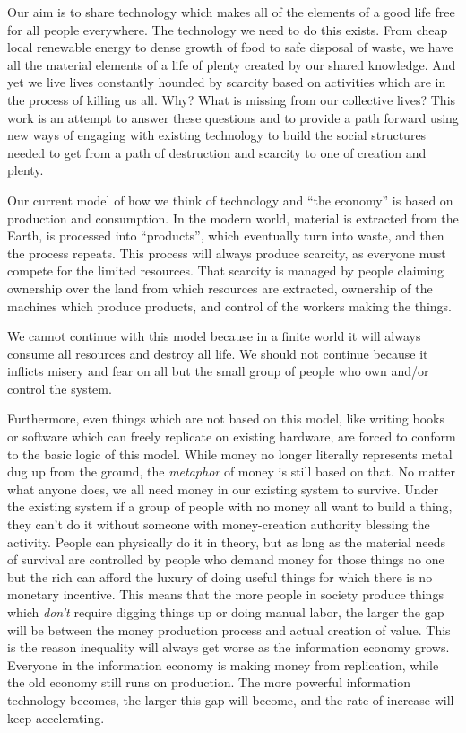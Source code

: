 

Our aim is to share technology which makes all of the elements of a good
life free for all people everywhere. The technology we need to do this
exists. From cheap local renewable energy to dense growth of food to
safe disposal of waste, we have all the material elements of a life of
plenty created by our shared knowledge. And yet we live lives constantly
hounded by scarcity based on activities which are in the process of
killing us all. Why? What is missing from our collective lives? This
work is an attempt to answer these questions and to provide a path
forward using new ways of engaging with existing technology to build the
social structures needed to get from a path of destruction and scarcity
to one of creation and plenty.

Our current model of how we think of technology and ``the economy'' is
based on production and consumption. In the modern world, material is
extracted from the Earth, is processed into ``products'', which
eventually turn into waste, and then the process repeats. This process
will always produce scarcity, as everyone must compete for the limited
resources. That scarcity is managed by people claiming ownership over
the land from which resources are extracted, ownership of the machines
which produce products, and control of the workers making the things.

We cannot continue with this model because in a finite world it will
always consume all resources and destroy all life. We should not
continue because it inflicts misery and fear on all but the small group
of people who own and/or control the system.

Furthermore, even things which are not based on this model, like writing
books or software which can freely replicate on existing hardware, are
forced to conform to the basic logic of this model. While money no
longer literally represents metal dug up from the ground, the
\emph{metaphor} of money is still based on that. No matter what anyone
does, we all need money in our existing system to survive. Under the
existing system if a group of people with no money all want to build a
thing, they can't do it without someone with money-creation authority
blessing the activity. People can physically do it in theory, but as
long as the material needs of survival are controlled by people who
demand money for those things no one but the rich can afford the luxury
of doing useful things for which there is no monetary incentive. This
means that the more people in society produce things which \emph{don't}
require digging things up or doing manual labor, the larger the gap will
be between the money production process and actual creation of value.
This is the reason inequality will always get worse as the information
economy grows. Everyone in the information economy is making money from
replication, while the old economy still runs on production. The more
powerful information technology becomes, the larger this gap will
become, and the rate of increase will keep accelerating.

